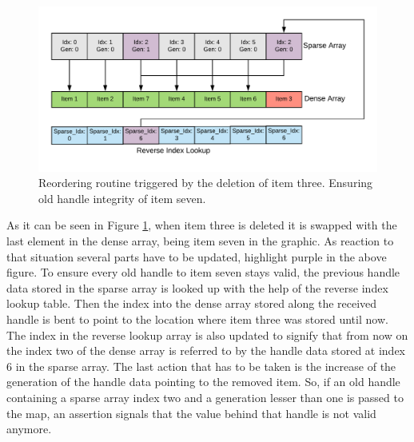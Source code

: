 \begin{figure}[h!]
	\centering \includegraphics[width=\linewidth]{PICs/handle_map_deletion.png}
	\caption{Reordering routine triggered by the deletion of item three. Ensuring old handle integrity of item seven.}
	\label{fig:handle_map_deletion}
\end{figure}

\newpage
\noindent
As it can be seen in Figure \ref{fig:handle_map_deletion}, when item three is deleted it is swapped with the last element in the dense array, being item seven in the graphic. As reaction to that situation several parts have to be updated, highlight purple in the above figure. To ensure every old handle to item seven stays valid, the previous handle data stored in the sparse array is looked up with the help of the reverse index lookup table. Then the index into the dense array stored along the received handle is bent to point to the location where item three was stored until now. The index in the reverse lookup array is also updated to signify that from now on the index two of the dense array is referred to by the handle data stored at index 6 in the sparse array. The last action that has to be taken is the increase of the generation of the handle data pointing to the removed item. So, if an old handle containing a sparse array index two and a generation lesser than one is passed to the map, an assertion signals that the value behind that handle is not valid anymore.\\

